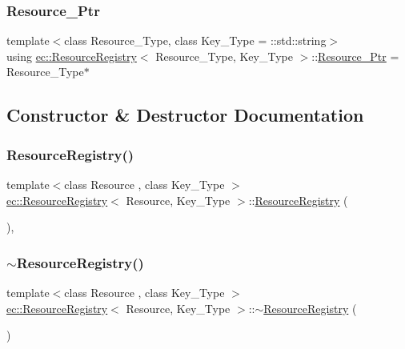 \subsubsection{\texorpdfstring{Resource\+\_\+\+Ptr}{Resource\_Ptr}}
{\footnotesize\ttfamily template$<$class Resource\+\_\+\+Type, class Key\+\_\+\+Type = \+::std\+::string$>$ \\
using \mbox{\hyperlink{classec_1_1_resource_registry}{ec\+::\+Resource\+Registry}}$<$ Resource\+\_\+\+Type, Key\+\_\+\+Type $>$\+::\mbox{\hyperlink{classec_1_1_resource_registry_aa3069d67662599730165c5d0df3043c9}{Resource\+\_\+\+Ptr}} =  Resource\+\_\+\+Type$\ast$}



\subsection{Constructor \& Destructor Documentation}
\mbox{\label{classec_1_1_resource_registry_a8ab460d164b940e5b08dfbe0b9e27263}} 
\subsubsection{\texorpdfstring{Resource\+Registry()}{ResourceRegistry()}}
{\footnotesize\ttfamily template$<$class Resource , class Key\+\_\+\+Type $>$ \\
\mbox{\hyperlink{classec_1_1_resource_registry}{ec\+::\+Resource\+Registry}}$<$ Resource, Key\+\_\+\+Type $>$\+::\mbox{\hyperlink{classec_1_1_resource_registry}{Resource\+Registry}} (\begin{DoxyParamCaption}{ }\end{DoxyParamCaption})\hspace{0.3cm}{\ttfamily [explicit]}, {\ttfamily [default]}}

\mbox{\label{classec_1_1_resource_registry_a3b2ee8793e4fa32075be7ce3a59fe472}} 
\subsubsection{\texorpdfstring{$\sim$\+Resource\+Registry()}{~ResourceRegistry()}}
{\footnotesize\ttfamily template$<$class Resource , class Key\+\_\+\+Type $>$ \\
\mbox{\hyperlink{classec_1_1_resource_registry}{ec\+::\+Resource\+Registry}}$<$ Resource, Key\+\_\+\+Type $>$\+::$\sim$\mbox{\hyperlink{classec_1_1_resource_registry}{Resource\+Registry}} (\begin{DoxyParamCaption}{ }\end{DoxyParamCaption})\hspace{0.3cm}{\ttfamily [default]}}



